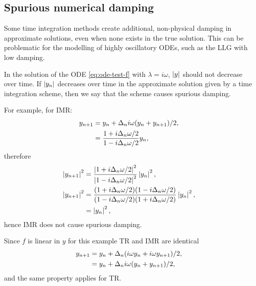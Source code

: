 \subsection{Spurious numerical damping}
\label{sec:numerical-damping}

Some time integration methods create additional, non-physical damping in approximate solutions, even when none exists in the true solution.
This can be problematic for the modelling of highly oscillatory ODEs, such as the LLG with low damping.

In the solution of the ODE \cref{eq:ode-test-f} with $\lambda = i\omega$, $\left|{y} \right|$ should not decrease over time.
If $\left|{y_n} \right|$ decreases over time in the approximate solution given by a time integration scheme, then we say that the scheme causes spurious damping.

For example, for IMR:
\begin{equation}
  \begin{aligned}
    y_{n+1} &= y_n + \Delta_{n} i \omega (y_n + y_{n+1})/2, \\
    &= \frac{1 + i\Delta_{n} \omega/2}{1 - i\Delta_{n} \omega/2} y_n,
  \end{aligned}
\end{equation}
therefore
\begin{equation}
  \begin{aligned}
    \left|{y_{n+1}} \right|^2 &=  \frac{\left|{1 + i\Delta_{n} \omega/2} \right|^2}{\left|{1 - i\Delta_{n} \omega/2} \right|^2} \left|{y_n} \right|^2, \\
    \left|{y_{n+1}} \right|^2 &=  \frac{(1 + i\Delta_{n} \omega/2)(1 - i\Delta_{n} \omega/2)}
    {(1 - i\Delta_{n} \omega/2)(1 + i\Delta_{n} \omega/2)} \left|{y_n} \right|^2, \\
    &=  \left|{y_n} \right|^2,
  \end{aligned}
\end{equation}
hence IMR does not cause spurious damping.

Since $f$ is linear in $y$ for this example TR and IMR are identical
\begin{equation}
  \begin{aligned}
    y_{n+1} &= y_n + \Delta_{n}(i\omega y_n + i\omega y_{n+1})/2, \\
    &= y_n + \Delta_{n} i \omega (y_n + y_{n+1})/2,
  \end{aligned}
\end{equation}
and the same property applies for TR.

